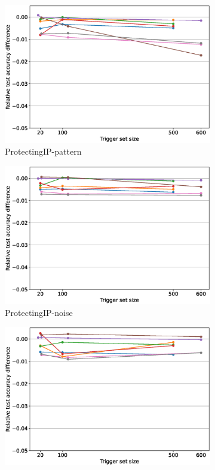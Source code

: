 \begin{figure}
\begin{subfigure}{0.4\linewidth}
        \includegraphics[width=\linewidth]{images/fidelity/ProtectingIP-pattern_fidelity_rel_per_method.eps}
        \caption{ProtectingIP-pattern}
        \label{fig:fidelity-pattern}
    \end{subfigure}
    \quad
    \begin{subfigure}{0.4\linewidth}
        \includegraphics[width=\linewidth]{images/fidelity/ProtectingIP-noise_fidelity_rel_per_method.eps}
        \caption{ProtectingIP-noise}
        \label{fig:fidelity-noise}
    \end{subfigure}
    \quad
    \begin{subfigure}{0.4\linewidth}
        \includegraphics[width=\linewidth]{images/fidelity/PiracyResistant_fidelity_rel_per_method.eps}

\end{subfigure}
\end{figure}
